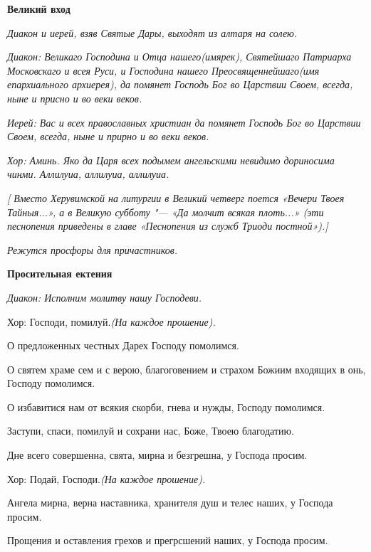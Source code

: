 \medskip\bfseries  Великий вход \normalfont{}\nopagebreak


\itshape  Диакон и иерей, взяв Святые Дары, выходят из алтаря на солею.\normalfont{}


\itshape  Диакон:\normalfont{} Великаго Господина и Отца нашего\itshape  (имярек),\normalfont{} Святейшаго Патриарха Московскаго и всея Руси, и Господина нашего Преосвященнейшаго\itshape  (имя епархиального архиерея),\normalfont{} да помянет Господь Бог во Царствии Своем, всегда, ныне и присно и во веки веков.


\itshape  Иерей:\normalfont{} Вас и всех православных христиан да помянет Господь Бог во Царствии Своем, всегда, ныне и прирно и во веки веков.


\itshape Хор:\normalfont{} Аминь. Яко да Царя всех подымем ангельскими невидимо дориносима чинми. Аллилуиа, аллилуиа, аллилуиа.


 \itshape  [ Вместо Херувимской на литургии в Великий четверг поется \normalfont{}«Вечери Твоея Тайныя..\itshape .», а в Великую субботу "--- \normalfont{}«Да молчит всякая плоть..\itshape .» (эти песнопения приведены в главе «Песнопения из служб Триоди постной»).]\normalfont{}



\itshape  Режутся просфоры для причастников\normalfont{}. 


\medskip\bfseries Просительная ектения \normalfont{}\nopagebreak


\itshape  Диакон:\normalfont{} Исполним молитву нашу Господеви. \itshape 


  Хор:\normalfont{} Господи, помилуй.\itshape  (На каждое прошение\normalfont{}). 


  О предложенных честных Дарех Господу помолимся. 


  О святем храме сем и с верою, благоговением и страхом Божиим входящих в онь, Господу помолимся. 


  О избавитися нам от всякия скорби, гнева и нужды, Господу помолимся. 


  Заступи, спаси, помилуй и сохрани нас, Боже, Твоею благодатию. 


  Дне всего совершенна, свята, мирна и безгрешна, у Господа просим. \itshape 


  Хор:\normalfont{} Подай, Господи.\itshape  (На каждое прошение)\normalfont{}. 


  Ангела мирна, верна наставника, хранителя душ и телес наших, у Господа просим. 


  Прощения и оставления грехов и прегрсшений наших, у Господа просим. 


